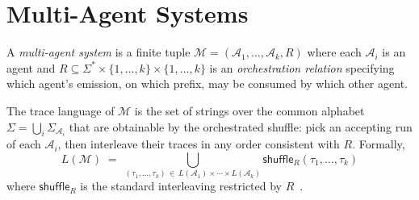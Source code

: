 
\section{Multi-Agent Systems}
\label{sec:multi-archived}

\begin{definition}
\label{def:multi}
A \emph{multi-agent system} is a finite tuple $\mathcal{M} =
(\mathcal{A}_1, \dots, \mathcal{A}_k, R)$ where each
$\mathcal{A}_i$ is an agent and $R \subseteq \Sigma^*\times\{1,
\dots,k\}\times\{1,\dots,k\}$ is an \emph{orchestration relation}
specifying which agent's emission, on which prefix, may be
consumed by which other agent.
\end{definition}

The trace language of $\mathcal{M}$ is the set of strings over the
common alphabet $\Sigma = \bigcup_i \Sigma_{\mathcal{A}_i}$ that
are obtainable by the orchestrated shuffle: pick an accepting run
of each $\mathcal{A}_i$, then interleave their traces in any order
consistent with $R$.  Formally,
\[
L(\mathcal{M}) \;=\;
\bigcup_{(\tau_1, \dots, \tau_k)\,\in\,
        L(\mathcal{A}_1)\times\cdots\times L(\mathcal{A}_k)}
\textsf{shuffle}_R(\tau_1, \dots, \tau_k)
\]
where $\textsf{shuffle}_R$ is the standard interleaving
restricted by $R$~\cite{hopcroft2006automata}.
